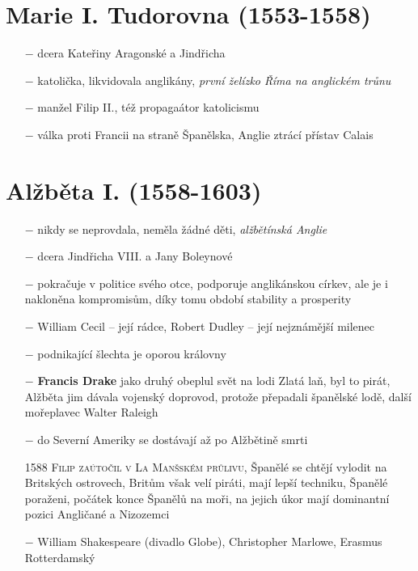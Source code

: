 \documentclass{article}
\begin{document}
\section*{Marie I. Tudorovna (1553-1558)}
\begin{itemize}
    \vspace{-0.5em}
    \setlength\itemsep{0.15em}
    \item[$-$] dcera Kateřiny Aragonské a Jindřicha
    \item[$-$] katolička, likvidovala anglikány, \textit{první želízko Říma na anglickém trůnu}
    \item[$-$] manžel Filip II., též propagaátor katolicismu
    \item[$-$] válka proti Francii na straně Španělska, Anglie ztrácí přístav Calais
\end{itemize}

\section*{Alžběta I. (1558-1603)}
\begin{itemize}
    \vspace{-0.5em}
    \setlength\itemsep{0.15em}
    \item[$-$] nikdy se neprovdala, neměla žádné děti, \textit{alžbětínská Anglie}
    \item[$-$] dcera Jindřicha VIII. a Jany Boleynové
    \item[$-$] pokračuje v politice svého otce, podporuje anglikánskou církev, ale je i nakloněna kompromisům, díky tomu období stability a prosperity
    \item[$-$] William Cecil -- její rádce, Robert Dudley -- její nejznámější milenec
    \item[$-$] podnikající šlechta je oporou královny
    \item[$-$] \textbf{Francis Drake} jako druhý obeplul svět na lodi Zlatá laň, byl to pirát, Alžběta jim dávala vojenský doprovod, protože přepadali španělské lodě, další mořeplavec Walter Raleigh
    \item[$-$] do Severní Ameriky se dostávají až po Alžbětině smrti
    \item[1588] \textsc{Filip zaútočil v La Manšském průlivu}, Španělé se chtějí vylodit na Britských ostrovech, Britům však velí piráti, mají lepší techniku, Španělé poraženi, počátek konce Španělů na moři, na jejich úkor mají dominantní pozici Angličané a Nizozemci
    \item[$-$] William Shakespeare (divadlo Globe), Christopher Marlowe, Erasmus Rotterdamský
\end{itemize}
\end{document}
